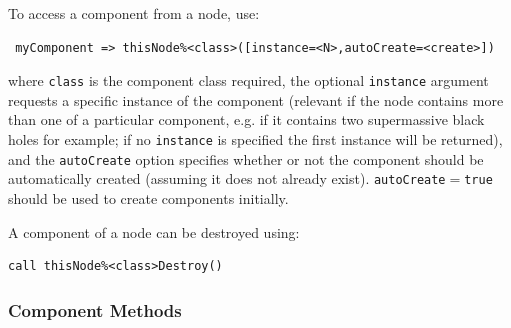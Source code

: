To access a component from a node, use:
\begin{verbatim}
 myComponent => thisNode%<class>([instance=<N>,autoCreate=<create>])
\end{verbatim}
where {\tt class} is the component class required, the optional {\tt instance} argument requests a specific instance of the component (relevant if the node contains more than one of a particular component, e.g. if it contains two supermassive black holes for example; if no {\tt instance} is specified the first instance will be returned), and the {\tt autoCreate} option specifies whether or not the component should be automatically created (assuming it does not already exist). {\tt autoCreate}$=${\tt true} should be used to create components initially.

A component of a node can be destroyed using:
\begin{verbatim}
call thisNode%<class>Destroy()
\end{verbatim}

\subsubsection{Component Methods}\label{sec:ComponentMethods}

